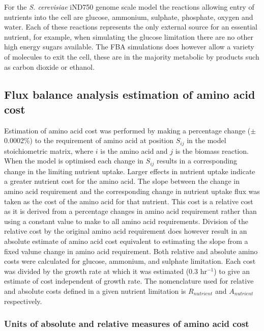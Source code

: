 For the \emph{S. cerevisiae} iND750 \cite{duarte2004a} genome scale model the reactions allowing entry of nutrients into the cell are glucose, ammonium, sulphate, phosphate, oxygen and water. Each of these reactions represents the only external source for an essential nutrient, for example, when simulating the glucose limitation there are no other high energy sugars available. The FBA simulations does however allow a variety of molecules to exit the cell, these are in the majority metabolic by products such as carbon dioxide or ethanol.

\subsection{Flux balance analysis estimation of amino acid cost}%

Estimation of amino acid cost was performed by making a percentage change ($\pm$0.0002\%) to the requirement of amino acid at position $S_{ij}$ in the model stoichiometric matrix, where $i$ is the amino acid and $j$ is the biomass reaction. When the model is optimised each change in $S_{ij}$ results in a corresponding change in the limiting nutrient uptake. Larger effects in nutrient uptake indicate a greater nutrient cost for the amino acid.  The slope between the change in amino acid requirement and the corresponding change in nutrient uptake flux was taken as the cost of the amino acid for that nutrient. This cost is a relative cost as it is derived from a percentage changes in amino acid requirement rather than using a constant value to make to all amino acid requirements. Division of the relative cost by the original amino acid requirement does however result in an absolute estimate of amino acid cost equivalent to estimating the slope from a fixed valune change in amino acid requirement. Both relative and absolute amino costs were calculated for glucose, ammonium, and sulphate limitation. Each cost was divided by the growth rate at which it was estimated (0.3 hr$^{-1}$) to give an estimate of cost independent of growth rate. The nomenclature used for relative and absolute costs defined in a given nutrient limitation is $R_{nutrient}$ and $A_{nutrient}$ respectively.

\subsubsection{Units of absolute and relative measures of amino acid cost}%

